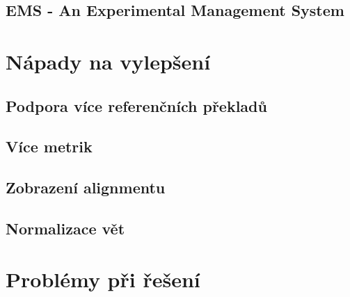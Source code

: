 \subsection{EMS - An Experimental Management System}
\section{Nápady na vylepšení}
\subsection{Podpora více referenčních překladů}

\subsection{Více metrik}

\subsection{Zobrazení alignmentu}

\subsection{Normalizace vět}


\section{Problémy při řešení}
